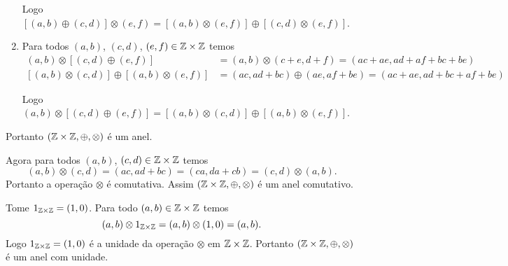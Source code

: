 \documentclass[12pt]{article}
\begin{document}
\begin{enumerate}
		Logo $[(a, b) \oplus (c, d)] \otimes (e, f) = [(a, b) \otimes (e, f)] \oplus [(c, d) \otimes (e, f)]$.

		\item Para todos $(a, b)$, $(c, d)$, $(e, f) \in \mathbb{Z} \times \mathbb{Z}$ temos
		\begin{align*}
			(a, b) \otimes [(c, d) \oplus (e, f)] &= (a, b) \otimes (c + e, d + f) = (ac + ae, ad + af + bc + be)\\
			[(a, b) \otimes (c, d)] \oplus [(a, b) \otimes (e, f)] &= (ac, ad + bc) \oplus (ae, af + be) = (ac + ae, ad + bc + af + be)
		\end{align*}

		Logo $(a, b) \otimes [(c, d) \oplus (e, f)] = [(a, b) \otimes (c, d)] \oplus [(a, b) \otimes (e, f)]$.
	\end{enumerate}

	Portanto $(\mathbb{Z} \times \mathbb{Z}, \oplus, \otimes)$ é um anel.

	Agora para todos $(a, b)$, $(c, d) \in \mathbb{Z} \times \mathbb{Z}$ temos
	\[
	 	(a, b) \otimes (c, d) = (ac, ad + bc) = (ca, da + cb) = (c, d) \otimes (a, b).
	\]
	Portanto a operação $\otimes$ é comutativa. Assim $(\mathbb{Z} \times \mathbb{Z}, \oplus, \otimes)$ é um anel comutativo.

	Tome $1_{\mathbb{Z} \times \mathbb{Z}} = (1, 0)$. Para todo $(a, b) \in \mathbb{Z} \times \mathbb{Z}$ temos
	\[
		(a, b) \otimes 1_{\mathbb{Z} \times \mathbb{Z}} = (a, b) \otimes (1, 0) = (a, b).
	\]
	Logo $1_{\mathbb{Z} \times \mathbb{Z}} = (1, 0)$ é a unidade da operação $\otimes$ em $\mathbb{Z} \times \mathbb{Z}$. Portanto $(\mathbb{Z} \times \mathbb{Z}, \oplus, \otimes)$ é um anel com unidade.
\end{document}

